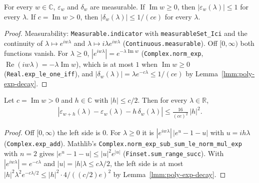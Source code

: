 \begin{lemma}
    \label{lmm:half-plane-exp-bounds}
    \leanok
    For every $w \in \mathbb{C}$, $\varepsilon_w$ and $\delta_w$ are measurable. If $\operatorname{Im} w \ge 0$, then $|\varepsilon_w(\lambda)| \le 1$ for every $\lambda$. If $c = \operatorname{Im} w > 0$, then $|\delta_w(\lambda)| \le 1/(ce)$ for every $\lambda$.
\end{lemma}
\begin{proof}
    \leanok
    Measurability: \texttt{Measurable.indicator} with \texttt{measurableSet\_Ici} and the continuity of $\lambda \mapsto e^{iw\lambda}$ and $\lambda \mapsto i\lambda e^{iw\lambda}$ (\texttt{Continuous.measurable}). Off $[0,\infty)$ both functions vanish. For $\lambda \ge 0$, $|e^{iw\lambda}| = e^{-\lambda\operatorname{Im} w}$ (\texttt{Complex.norm\_exp}, $\operatorname{Re}(iw\lambda) = -\lambda\operatorname{Im} w$), which is at most $1$ when $\operatorname{Im} w \ge 0$ (\texttt{Real.exp\_le\_one\_iff}), and $|\delta_w(\lambda)| = \lambda e^{-c\lambda} \le 1/(ce)$ by Lemma~\ref{lmm:poly-exp-decay}.
\end{proof}

\begin{lemma}
    \label{lmm:half-plane-exp-taylor}
    \leanok
    Let $c = \operatorname{Im} w > 0$ and $h \in \mathbb{C}$ with $|h| \le c/2$. Then for every $\lambda \in \mathbb{R}$,
    \begin{align}
        \left| \varepsilon_{w+h}(\lambda) - \varepsilon_w(\lambda) - h\,\delta_w(\lambda) \right| \le \frac{16}{(ce)^2}\,|h|^2.
    \end{align}
\end{lemma}
\begin{proof}
    \leanok
    Off $[0, \infty)$ the left side is $0$. For $\lambda \ge 0$ it is $|e^{iw\lambda}|\,|e^{u} - 1 - u|$ with $u = ih\lambda$ (\texttt{Complex.exp\_add}). Mathlib's \texttt{Complex.norm\_exp\_sub\_sum\_le\_norm\_mul\_exp} with $n = 2$ gives $|e^u - 1 - u| \le |u|^2 e^{|u|}$ (\texttt{Finset.sum\_range\_succ}). With $|e^{iw\lambda}| = e^{-c\lambda}$ and $|u| = |h|\lambda \le c\lambda/2$, the left side is at most $|h|^2\lambda^2 e^{-c\lambda/2} \le |h|^2 \cdot 4/((c/2)e)^2$ by Lemma~\ref{lmm:poly-exp-decay}.
\end{proof}

